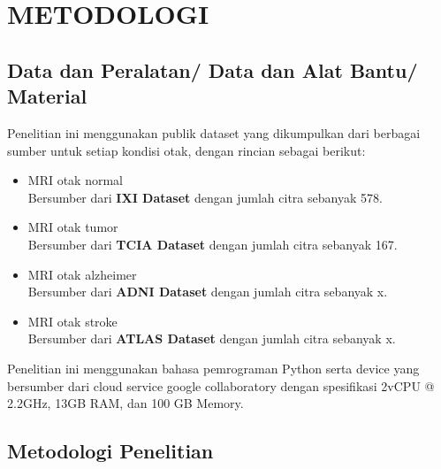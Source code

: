 \section{METODOLOGI}


\subsection{Data dan Peralatan/ Data dan Alat Bantu/ Material}

Penelitian ini menggunakan publik dataset yang dikumpulkan dari berbagai sumber untuk setiap kondisi otak, dengan rincian sebagai berikut:

\begin{itemize}
    \item MRI otak normal\\
          Bersumber dari \textbf{IXI Dataset} dengan jumlah citra sebanyak 578.
    \item MRI otak tumor\\
          Bersumber dari \textbf{TCIA Dataset} dengan jumlah citra sebanyak 167.
    \item MRI otak alzheimer\\
          Bersumber dari \textbf{ADNI Dataset} dengan jumlah citra sebanyak x.
    \item MRI otak stroke\\
          Bersumber dari \textbf{ATLAS Dataset} dengan jumlah citra sebanyak x.
\end{itemize}

Penelitian ini menggunakan bahasa pemrograman Python serta device yang bersumber dari cloud service google collaboratory dengan spesifikasi 2vCPU @ 2.2GHz, 13GB RAM, dan 100 GB Memory.

\subsection{Metodologi Penelitian}

